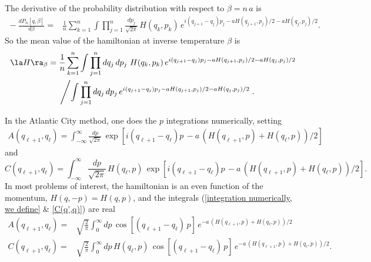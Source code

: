 \documentclass[prd,preprint,floatfix,showpacs]{revtex4-1}
\begin{document}
The derivative of the probability distribution 
with respect to \( \beta = n \, a \) is
\begin{equation}
 \begin{split}
{} - \frac{d  P_n[q,\beta] }{d \beta}
={}& \frac{1}{n} \sum_{k=1}^n 
\int \prod_{j=1}^n \frac{dp_j }{\sqrt{2\pi}} \, H(q_k,p_k) 
\, e^{ i (q_{j+1} - q_j) p_j - a H(q_{j+1},p_j)/2
 - a H(q_j,p_j)/2 } .
   \end{split}
\end{equation}
So the mean value of the hamiltonian 
at inverse temperature \( \beta \) is
\begin{equation}
   \begin{split}
\la H \ra_\beta ={}& 
\frac{1}{n} \sum_{k=1}^n 
\int \prod_{j=1}^n dq_j \, dp_j \,
\, H(q_k,p_k) 
\, e^{ i (q_{j+1} - q_j) p_j  - a H(q_{j+1},p_j)/2
 - a H(q_j,p_j)/2 }
\\
{}& \left/ \int \prod_{j=1}^n  
dq_j \, dp_j \,
e^{ i (q_{j+1} - q_j) p_j  - a H(q_{j+1},p_j)/2
 - a H(q_j,p_j)/2 } \right. .
 \label {maybe big eq for E0}
   \end{split}
\end{equation}
\par
In the Atlantic City method,
one does the \( p \) integrations numerically, setting
\begin{equation}
\begin{split}
A(q_{\ell+1}, q_\ell) 
= \int_{-\infty}^\infty \frac{dp}{\sqrt{2\pi}} \,
\exp \left[i (q_{\ell+1} - q_\ell) p \, 
- a \, \left( H(q_{\ell+1}, p) + H(q_\ell, p) \right)/2\right] 
\label {integration numerically, we define}
\end{split}
\end{equation}
and
\begin{equation}
C(q_{\ell+1},q_\ell) = {}  \int_{-\infty}^\infty 
\frac{dp}{\sqrt{2\pi}} \,
H(q_\ell, p) \,
\exp \left[i (q_{\ell+1} - q_\ell) p \, 
- a \, \left( H(q_{\ell+1}, p) + H(q_\ell, p) \right)/2 \right] .
\label {C(q',q)}
\end{equation}
In most problems of interest,
the hamiltonian is an even function
of the momentum, \( H(q,-p) = H(q,p) \),
and the integrals 
(\ref {integration numerically, we define} \&
\ref {C(q',q)}) are real
\begin{equation}
\begin{split}
A(q_{\ell+1}, q_\ell) = {} & \sqrt{\frac{2}{\pi}}
\int_0^\infty dp \,
\cos \left[(q_{\ell+1} - q_\ell) \, p \right] \,
e^{- a \, \left( H(q_{\ell+1}, p) + H(q_\ell, p) \right)/2 } 
\\
C(q_{\ell+1}, q_\ell) = {} & \sqrt{\frac{2}{\pi}}
\int_0^\infty dp \, H(q_\ell, p) \,
\cos \left[ (q_{\ell+1} - q_\ell) \, p \right] \,
e^{- a \, \left( H(q_{\ell+1}, p) + H(q_\ell, p) \right)/2 }  .
\label {and the integrals are real}
\end{split}
\end{equation}
\end{document}
